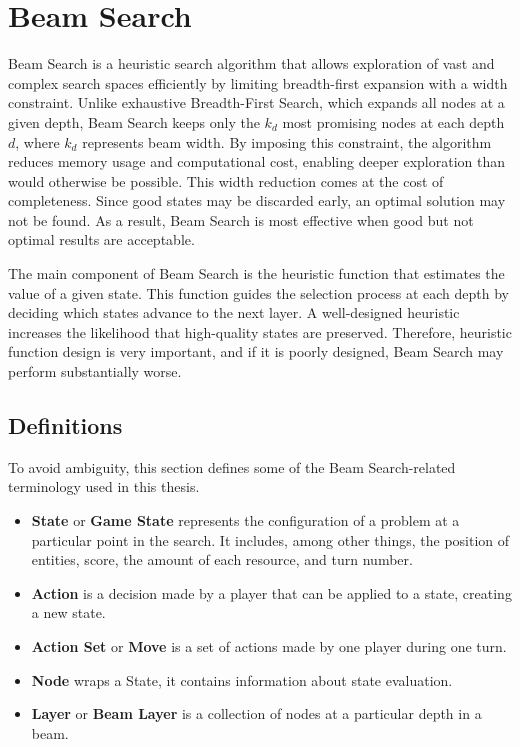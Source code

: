\documentclass[shortabstract, mgr, english]{iithesis}
\begin{document}
\chapter{Beam Search}
\label{chapter:BeamSearch}
Beam Search is a heuristic search algorithm that allows exploration of vast and complex search spaces efficiently by limiting breadth-first expansion with a width constraint. Unlike exhaustive Breadth-First Search, which expands all nodes at a given depth, Beam Search keeps only the $k_d$ most promising nodes at each depth $d$, where $k_d$ represents beam width. By imposing this constraint, the algorithm reduces memory usage and computational cost, enabling deeper exploration than would otherwise be possible. This width reduction comes at the cost of completeness. Since good states may be discarded early, an optimal solution may not be found. As a result, Beam Search is most effective when good but not optimal results are acceptable.

The main component of Beam Search is the heuristic function that estimates the value of a given state. This function guides the selection process at each depth by deciding which states advance to the next layer. A well-designed heuristic increases the likelihood that high-quality states are preserved. Therefore, heuristic function design is very important, and if it is poorly designed, Beam Search may perform substantially worse.

\section{Definitions}
To avoid ambiguity, this section defines some of the Beam Search-related terminology used in this thesis.
\begin{itemize}[itemsep=1\itemsep,parsep=1\parsep,partopsep=1\partopsep,topsep=1\topsep]
    \item \textbf{State} or \textbf{Game State} represents the configuration of a problem at a particular point in the search. It includes, among other things, the position of entities, score, the amount of each resource, and turn number.
    \item \textbf{Action} is a decision made by a player that can be applied to a state, creating a new state.
    \item \textbf{Action Set} or \textbf{Move} is a set of actions made by one player during one turn. 
    \item \textbf{Node} wraps a State, it contains information about state evaluation.
    \item \textbf{Layer} or \textbf{Beam Layer} is a collection of nodes at a particular depth in a beam.
\end{itemize}
\end{document}
